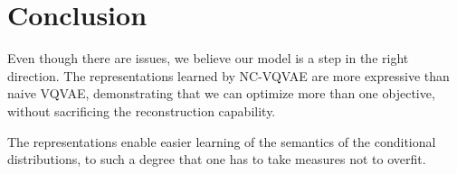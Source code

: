 \documentclass[../../thesis.tex]{subfiles}
\begin{document}




\section{Conclusion}
Even though there are issues, we believe our model is a step in the right direction. The representations learned by NC-VQVAE are more expressive than naive VQVAE, demonstrating that we can optimize more than one objective, without sacrificing the reconstruction capability. 

The representations enable easier learning of the semantics of the conditional distributions, to such a degree that one has to take measures not to overfit. 
\end{document}
